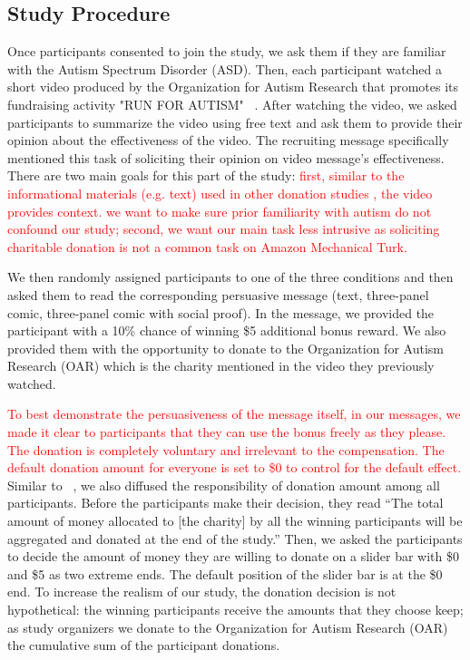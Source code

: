 \subsection{Study Procedure} 
\label{sub:Study Procedure}
Once participants consented to join the study, we ask them if they are familiar with the Autism Spectrum Disorder (ASD). Then, each participant watched a short video produced by the Organization for Autism Research that promotes its fundraising activity "RUN FOR AUTISM" ~\cite{youtube_research}. After watching the video, we asked participants to summarize the video using free text and ask them to provide their opinion about the effectiveness of the video. The recruiting message specifically mentioned this task of soliciting their opinion on video message's effectiveness. There are two main goals for this part of the study: \textcolor{red}{first, similar to the informational materials (e.g. text) used in other donation studies \cite{lee2013does,10362981,FEILER20121322}, the video provides context. we want to make sure prior familiarity with autism do not confound our study; second, we want our main task less intrusive as soliciting charitable donation is not a common task on Amazon Mechanical Turk.}

We then randomly assigned participants to one of the three conditions and then asked them to read the corresponding persuasive message (text, three-panel comic, three-panel comic with social proof). In the message, we provided the participant with a 10\% chance of winning \$5 additional bonus reward. We also provided them with the opportunity to donate to the Organization for Autism Research (OAR) which is the charity mentioned in the video they previously watched. 

\textcolor{red}{To best demonstrate the persuasiveness of the message itself, in our messages, we made it clear to participants that they can use the bonus freely as they please. The donation is completely voluntary and irrelevant to the compensation. The default donation amount for everyone is set to \$0 to control for the default effect.} Similar to ~\textcite{lee2013does}, we also diffused the responsibility of donation amount among all participants. Before the participants make their decision, they read ``The total amount of money allocated to [the charity] by all the winning participants will be aggregated and donated at the end of the study.'' Then, we asked the participants to decide the amount of money they are willing to donate on a slider bar with \$0 and \$5 as two extreme ends. The default position of the slider bar is at the \$0 end. To increase the realism of our study, the donation decision is not hypothetical: the winning participants receive the amounts that they choose keep; as study organizers we donate to the Organization for Autism Research (OAR) the cumulative sum of the participant donations. 

